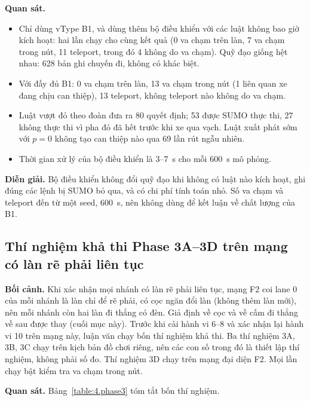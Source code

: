 \documentclass[../DoAn.tex]{subfiles}
\begin{document}
\textbf{Quan sát.}
\begin{itemize}
    \item Chỉ dùng vType B1, và dùng thêm bộ điều khiển với các luật không bao giờ kích hoạt: hai lần chạy cho cùng kết quả (0 va chạm trên làn, 7 va chạm trong nút, 11 teleport, trong đó 4 không do va chạm). Quỹ đạo giống hệt nhau: 628 bản ghi chuyến đi, không có khác biệt.
    \item Với đầy đủ B1: 0 va chạm trên làn, 13 va chạm trong nút (1 liên quan xe đang chịu can thiệp), 13 teleport, không teleport nào không do va chạm.
    \item Luật vượt đỏ theo đoàn đưa ra 80 quyết định; 53 được SUMO thực thi, 27 không thực thi vì pha đỏ đã hết trước khi xe qua vạch. Luật xuất phát sớm với $p = 0$ không tạo can thiệp nào qua 69 lần rút ngẫu nhiên.
    \item Thời gian xử lý của bộ điều khiển là 3--7~s cho mỗi 600~s mô phỏng.
\end{itemize}

\textbf{Diễn giải.} Bộ điều khiển không đổi quỹ đạo khi không có luật nào kích hoạt, ghi đúng các lệnh bị SUMO bỏ qua, và có chi phí tính toán nhỏ. Số va chạm và teleport đến từ một seed, 600~s, nên không dùng để kết luận về chất lượng của B1.

\subsection{Thí nghiệm khả thi Phase 3A--3D trên mạng có làn rẽ phải liên tục}
\label{subsection:phase3}

\textbf{Bối cảnh.} Khi xác nhận mọi nhánh có làn rẽ phải liên tục, mạng F2 coi lane 0 của mỗi nhánh là làn chỉ để rẽ phải, có cọc ngăn đổi làn (không thêm làn mới), nên mỗi nhánh còn hai làn đi thẳng có đèn. Giả định về cọc và về cấm đi thẳng về sau được thay (cuối mục này). Trước khi cài hành vi 6--8 và xác nhận lại hành vi 10 trên mạng này, luận văn chạy bốn thí nghiệm khả thi. Ba thí nghiệm 3A, 3B, 3C chạy trên kịch bản đồ chơi riêng, nên các con số trong đó là thiết lập thí nghiệm, không phải số đo. Thí nghiệm 3D chạy trên mạng đại diện F2. Mọi lần chạy bật kiểm tra va chạm trong nút.

\textbf{Quan sát.} Bảng~\ref{table:4.phase3} tóm tắt bốn thí nghiệm.
\end{document}
